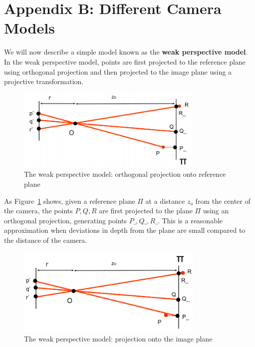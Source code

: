 \documentclass[a4paper, 12pt]{article}
\renewcommand\emph{\textbf}
\begin{document}
\section{Appendix B: Different Camera Models}
We will now describe a simple model known as the \emph{weak perspective model}. In the weak perspective model, points are first projected to the reference plane using orthogonal projection and then projected to the image plane using a projective transformation.
\begin{figure}[h!]
\centering
\includegraphics[width=0.8\textwidth]{figures/weak_perspective.png}
\caption{The weak perspective model: orthogonal projection onto reference plane}
\label{fig:weak_perspective}
\end{figure}

As Figure~\ref{fig:weak_perspective} shows, given a reference plane $\Pi$ at a distance $z_o$ from the center of the camera, the points $P,Q,R$ are first projected to the plane $\Pi$ using an orthogonal projection, generating points $P\_, Q\_, R\_$.  This is a reasonable approximation when deviations in depth from the plane are small compared to the distance of the camera. 

\begin{figure}[h!]
\centering
\includegraphics[width=0.8\textwidth]{figures/weak_perspective2.png}
\caption{The weak perspective model: projection onto the image plane}
\label{fig:weak_perspective2}
\end{figure}
\end{document}
